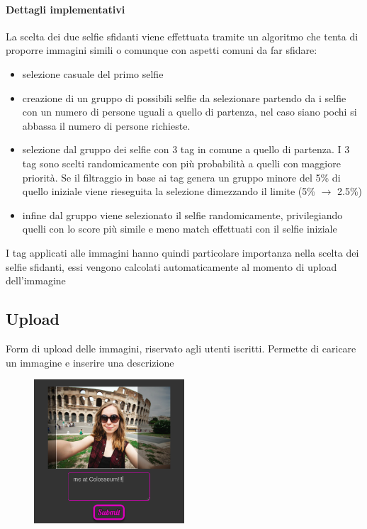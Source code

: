 \documentclass{article}
\begin{document}
\paragraph{Dettagli implementativi}
La scelta dei due selfie sfidanti viene effettuata tramite un algoritmo che tenta di proporre immagini simili o comunque con aspetti comuni da far sfidare:
\begin{itemize}
\item selezione casuale del primo selfie
\item creazione di un gruppo di possibili selfie da selezionare partendo da i selfie con un numero di persone uguali a quello di partenza, nel caso siano pochi si abbassa il numero di persone richieste.
\item selezione dal gruppo dei selfie con 3 tag in comune a quello di partenza. I 3 tag sono scelti randomicamente con più probabilità a quelli con maggiore priorità. Se il filtraggio in base ai tag genera un gruppo minore del 5\% di quello iniziale viene rieseguita la selezione dimezzando il limite (5\% $\to$ 2.5\%)
\item infine dal gruppo viene selezionato il selfie randomicamente, privilegiando quelli con lo score più simile e meno match effettuati con il selfie iniziale
\end{itemize}
I tag applicati alle immagini hanno quindi particolare importanza nella scelta dei selfie sfidanti, essi vengono calcolati automaticamente al momento di upload dell'immagine

\subsection{Upload}
Form di upload delle immagini, riservato agli utenti iscritti.
Permette di caricare un immagine e inserire una descrizione\\

\begin{figure}
\includegraphics[width=0.5\textwidth]{res/upload.png}
\end{figure} 
\end{document}
